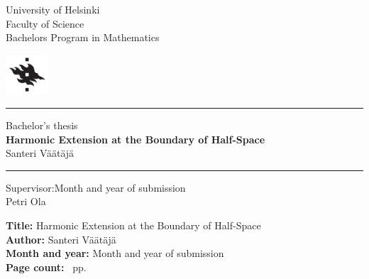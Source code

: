 \documentclass[a4paper, 11pt]{report}
\theoremstyle{plain}
\theoremstyle{definition}
\theoremstyle{remark}
\begin{document}
%
%
\begin{titlepage}

\noindent
\begin{minipage}[b]{\textwidth-45pt}
University of Helsinki\\
Faculty of Science\\
Bachelors Program in Mathematics
\end{minipage}
\hfill\includegraphics[width=45pt]{HYlogo.pdf}

\vspace{4pt}\hrule\vfill

\begin{center}
Bachelor's thesis\\[8pt]

{\huge\bfseries Harmonic Extension at the Boundary of Half-Space}\\[8pt]

Santeri Väätäjä
\end{center}

\vfill\hrule\vspace{4pt}

\noindent
Supervisor:\hfill Month and year of submission\\
Petri Ola\\
\end{titlepage}

%
%
\cleardoublepage

\noindent\textbf{Title:} Harmonic Extension at the Boundary of Half-Space\\ %
\textbf{Author:} Santeri Väätäjä\\ %
\textbf{Month and year:} Month and year of submission\\ %
\textbf{Page count:} \pageref*{LastPage}~pp.\\[1em] %
\end{document}
